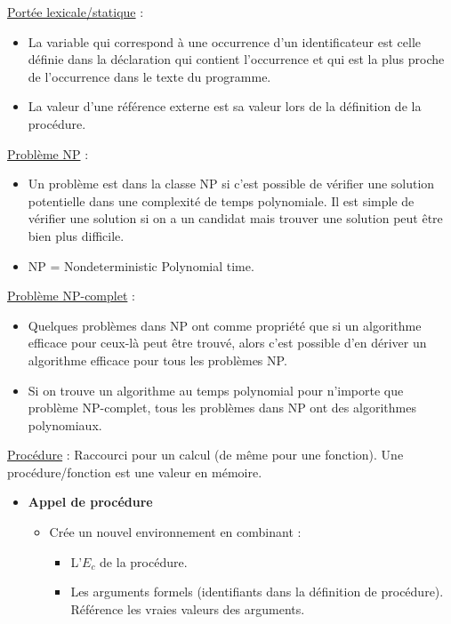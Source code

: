 \documentclass[fr,license=none]{../../../eplsummary}
\begin{document}
\begin{flushleft}
\textcolor{mauvedef}{\underline{Portée lexicale/statique}} :

\begin{itemize}
\item La variable qui correspond à une occurrence d’un identificateur est celle définie dans la déclaration qui contient l’occurrence et qui est la plus proche de l’occurrence dans le texte du programme.
\item La valeur d’une référence externe est sa valeur lors de la définition de la procédure.
\end{itemize}\bigbreak

\textcolor{mauvedef}{\underline{Problème NP}} :
\begin{itemize}
\item Un problème est dans la classe NP si c'est possible de vérifier une solution potentielle dans une complexité de temps polynomiale. Il est simple de vérifier une solution si on a un candidat mais trouver une solution peut être bien plus difficile. 
\item NP = Nondeterministic Polynomial time.
\end{itemize}
\bigbreak

\textcolor{mauvedef}{\underline{Problème NP-complet}} :
\begin{itemize}
\item Quelques problèmes dans NP ont comme propriété que si un algorithme efficace pour ceux-là peut être trouvé, alors c'est possible d'en dériver un algorithme efficace pour tous les problèmes NP.
\item Si on trouve un algorithme au temps polynomial pour n'importe que problème NP-complet, tous les problèmes dans NP ont des algorithmes polynomiaux.
\end{itemize}
\bigbreak



\textcolor{mauvedef}{\underline{Procédure}} : Raccourci pour un calcul (de même pour une fonction). Une procédure/fonction est une valeur en mémoire.
\begin{itemize}
\item \textbf{Appel de procédure}
\begin{itemize} [label=\textbullet, font=\MEDIUM]
\item Crée un nouvel environnement en combinant :
\begin{itemize} [label=\circ]
\item L'\textcolor{miorangerouge}{$E_c$} de la procédure.
\item Les arguments formels (identifiants dans la définition de procédure). Référence les vraies valeurs des arguments.
\end{itemize}


\end{itemize}
\end{itemize}
\end{flushleft}
\end{document}
